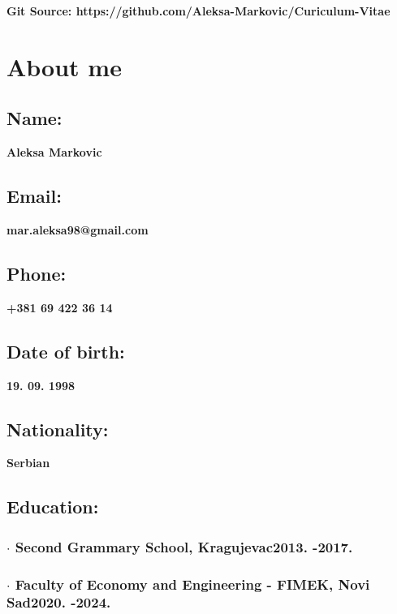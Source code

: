 \documentclass{article}
\author{\textbf{Aleksa Markovic}}
\renewcommand{\maketitle}{
	\begin{center}
		\vspace{.3em}
		{\LARGE\bfseries\theauthor}\break
		\vspace{.3em}
		{}\titlerule\break
		\vspace{.3em}
		{\textbf{\normalsize{Git Source: https://github.com/Aleksa-Markovic/Curiculum-Vitae}}}
	\end{center}	
}
\begin{document}
	\maketitle
	
	\section{\MakeUppercase{A}bout me}
	\subsection{\large{Name:}}
	\textbf{\large{Aleksa Markovic}}
	\subsection{\large{Email:}}
	\textbf{\large{mar.aleksa98@gmail.com}}
	\subsection{\large{Phone:}}
	\textbf{\large{+381 69 422 36 14}}
	\subsection{\large{Date of birth:}}
	\textbf{\large{19. 09. 1998}}
	\subsection{\large{Nationality:}}
	\textbf{\large{Serbian}}
	\subsection{\large{Education:}}
	\subsubsection{{$\cdot$ }Second Grammary School, Kragujevac\hfill 2013. -2017.}
	\subsubsection{{$\cdot$ }Faculty of Economy and Engineering - FIMEK, Novi Sad\hfill 2020. -2024.}
\end{document}
